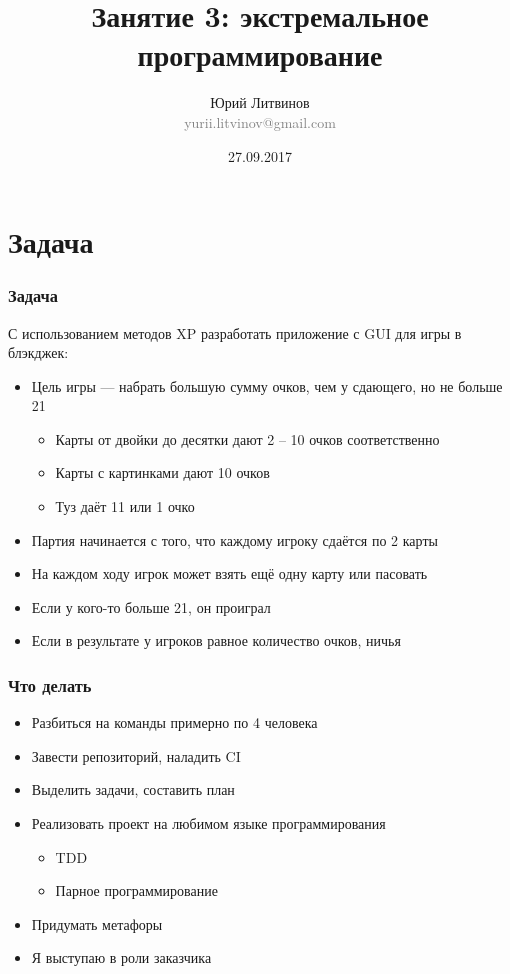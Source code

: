 \documentclass[xetex,mathserif,serif]{beamer}
\title{Занятие 3: экстремальное программирование}
\author[Юрий Литвинов]{Юрий Литвинов\\\small{\textcolor{gray}{yurii.litvinov@gmail.com}}}
\date{27.09.2017}
\begin{document}
	\frame{\titlepage}

	\section{Задача}

	\begin{frame}
		\frametitle{Задача}
		С использованием методов XP разработать приложение с GUI для игры в блэкджек:
		\begin{itemize}
			\item Цель игры --- набрать большую сумму очков, чем у сдающего, но не больше 21
			\begin{itemize}
				\item Карты от двойки до десятки дают 2 -- 10 очков соответственно
				\item Карты с картинками дают 10 очков
				\item Туз даёт 11 или 1 очко
			\end{itemize}
			\item Партия начинается с того, что каждому игроку сдаётся по 2 карты
			\item На каждом ходу игрок может взять ещё одну карту или пасовать
			\item Если у кого-то больше 21, он проиграл
			\item Если в результате у игроков равное количество очков, ничья
		\end{itemize}
	\end{frame}

	\begin{frame}
		\frametitle{Что делать}
		\begin{itemize}
			\item Разбиться на команды примерно по 4 человека
			\item Завести репозиторий, наладить CI
			\item Выделить задачи, составить план
			\item Реализовать проект на любимом языке программирования
			\begin{itemize}
				\item TDD
				\item Парное программирование
			\end{itemize}
			\item Придумать метафоры
			\item Я выступаю в роли заказчика
		\end{itemize}
	\end{frame}
\end{document}
